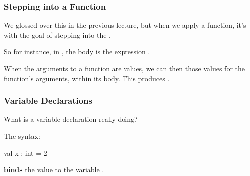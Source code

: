 \documentclass[aspectratio=169]{beamer}
\begin{document}
\begin{frame}[fragile]
  \frametitle{Stepping into a Function}

  We glossed over this in the previous lecture, but when we 
  apply a function, it's with the goal of stepping into the
  .

  \pause
  \vspace{\fill}


  \vspace{\fill}
  
  So for instance, in , the 
  body is the expression .

  \pause
  \vspace{\fill}

  When the arguments to a function are values, we can then 
   those values for the function's arguments,
  within its body. This produces .
\end{frame}


\begin{frame}[fragile]
  \frametitle{Variable Declarations}

  What is a variable declaration really doing?

  \pause
  \vspace{\fill}

  The syntax: 

  \begin{codeblock}
    val x : int = 2
  \end{codeblock}

  \textbf{binds} the value  to the variable . 

  \pause
  \vspace{\fill}


  \pause
  \vspace{\fill}

\end{frame}
\end{document}
